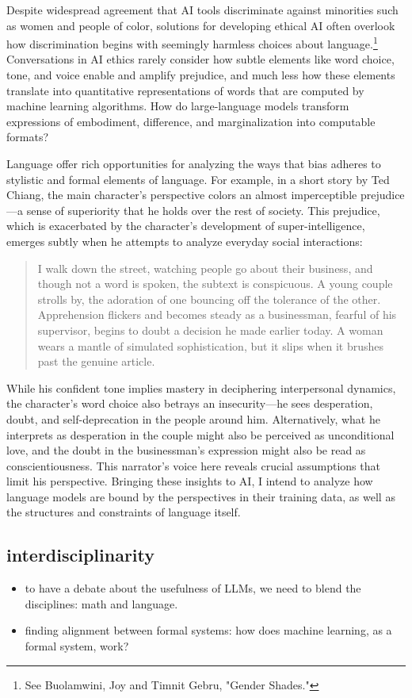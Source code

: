 \documentclass[11pt]{article}
\begin{document}
Despite widespread agreement that AI tools discriminate against
minorities such as women and people of color, solutions for developing
ethical AI often overlook how discrimination begins with seemingly
harmless choices about language.\footnote{See Buolamwini, Joy and Timnit Gebru, "Gender Shades."} Conversations in AI ethics
rarely consider how subtle elements like word choice, tone, and voice
enable and amplify prejudice, and much less how these elements
translate into quantitative representations of words that are computed
by machine learning algorithms. How do large-language models transform
expressions of embodiment, difference, and marginalization into
computable formats?

Language offer rich opportunities for analyzing the ways that bias
adheres to stylistic and formal elements of language. For example, in
a short story by Ted Chiang, the main character’s perspective colors
an almost imperceptible prejudice—a sense of superiority that he holds
over the rest of society. This prejudice, which is exacerbated by the
character’s development of super-intelligence, emerges subtly when he
attempts to analyze everyday social interactions:
\begin{quote}
I walk down the street, watching people go about their business, and
though not a word is spoken, the subtext is conspicuous. A young
couple strolls by, the adoration of one bouncing off the tolerance of
the other. Apprehension flickers and becomes steady as a businessman,
fearful of his supervisor, begins to doubt a decision he made earlier
today. A woman wears a mantle of simulated sophistication, but it
slips when it brushes past the genuine article.
\end{quote}
While his confident tone implies mastery in deciphering interpersonal
dynamics, the character’s word choice also betrays an insecurity—he
sees desperation, doubt, and self-deprecation in the people around
him. Alternatively, what he interprets as desperation in the couple
might also be perceived as unconditional love, and the doubt in the
businessman’s expression might also be read as conscientiousness. This
narrator’s voice here reveals crucial assumptions that limit his
perspective. Bringing these insights to AI, I intend to analyze how
language models are bound by the perspectives in their training data,
as well as the structures and constraints of language itself.



\subsection{interdisciplinarity}
\label{sec:org7eb2d00}
\begin{itemize}
\item to have a debate about the usefulness of LLMs, we need to blend the
disciplines: math and language.
\item finding alignment between formal systems: how does machine learning,
as a formal system, work?
\end{itemize}
\end{document}
